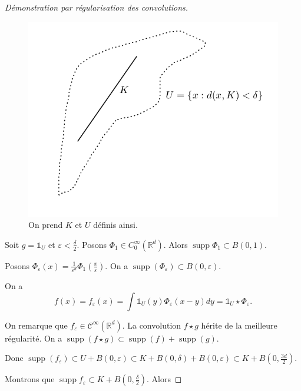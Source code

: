 \documentclass[french]{book}
\theoremstyle{definition}
\newcommand{\lesss}{<}
\newcommand{\less}{\lesss}
\begin{document}
\begin{proof}[Démonstration par régularisation des convolutions]
  \begin{figure}[h!]
    \centering
    \includegraphics[scale=0.3]{figures/reg_conv.png}
    \caption{On prend \(K\) et \(U\) définis ainsi.}
    \label{}
  \end{figure}

  Soit \(g = \mathds{1}_{U}\) et \(\varepsilon \less \frac{\delta}{2}\). Posons \(\Phi_1 \in C _{0}^{\infty}(\mathbb{R}^d)\). Alors \(\operatorname{supp}\Phi_1 \subset B(0,1)\).

  Posons \(\Phi _{\varepsilon}(x) = \frac{1}{\varepsilon ^{d}}\Phi_1 \left(\frac{x}{\varepsilon}\right)\). On a \(\operatorname{supp}(\Phi _{\varepsilon}) \subset B(0,\varepsilon)\).

  On a \[f(x) = f _{\varepsilon}(x) = \int \mathds{1}_{U}(y)\Phi _{\varepsilon}(x-y)dy = \mathds{1}_{U} \star \Phi _{\varepsilon}.\]

  On remarque que \(f _{\varepsilon} \in \mathcal{C}^{\infty}(\mathbb{R}^{d})\). La convolution \(f \star g\) hérite de la meilleure régularité. On  a \(\operatorname{supp}(f \star g) \subset \operatorname{supp}(f) + \operatorname{supp}(g)\).

  Donc \(\operatorname{supp}(f _{\varepsilon}) \subset U + B(0,\varepsilon) \subset K + B(0,\delta)+ B(0,\varepsilon)\subset K+ B \left(0, \frac{3 d}{2}\right)\).

  Montrons que \(\operatorname{supp}f _{\varepsilon}\subset K + B \left(0, \frac{\delta}{2}\right)\). Alors


\end{proof}
\end{document}
